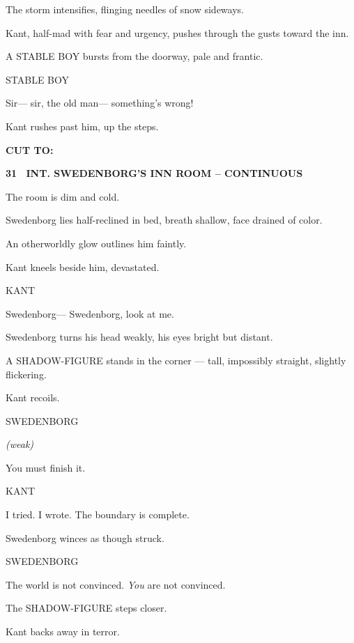 \documentclass[12pt]{article}
\newcommand{\scene}[2]{%
  \vspace{1.8\baselineskip}%
  \noindent\textbf{#1 \ #2}\par\vspace{0.4\baselineskip}%
}
\newenvironment{dialogue}[1]{%
  \vspace{0.8\baselineskip}%
  \noindent\hspace*{2.3in}\textsc{#1}\par%
  \noindent\hspace*{1.5in}\begin{minipage}[t]{4.5in}%
}{%
  \end{minipage}\par%
}
\newcommand{\paren}[1]{%
  \noindent\hspace*{1.8in}\textit{(#1)}\par%
}
\newcommand{\transition}[1]{%
  \vspace{0.6\baselineskip}%
  \begin{flushright}\textbf{#1}\end{flushright}%
}
\begin{document}
The storm intensifies, flinging needles of snow sideways.

Kant, half-mad with fear and urgency, pushes through the gusts toward
the inn.

A STABLE BOY bursts from the doorway, pale and frantic.

\begin{dialogue}{STABLE BOY}
Sir— sir, the old man— something’s wrong!
\end{dialogue}

Kant rushes past him, up the steps.

\transition{CUT TO:}


\scene{31}{INT. SWEDENBORG’S INN ROOM -- CONTINUOUS}

The room is dim and cold.

Swedenborg lies half-reclined in bed, breath shallow, face drained of
color.

An otherworldly glow outlines him faintly.

Kant kneels beside him, devastated.

\begin{dialogue}{KANT}
Swedenborg— Swedenborg, look at me.
\end{dialogue}

Swedenborg turns his head weakly, his eyes bright but distant.

A SHADOW-FIGURE stands in the corner — tall, impossibly straight,
slightly flickering.

Kant recoils.

\begin{dialogue}{SWEDENBORG}
\paren{weak}
You must finish it.
\end{dialogue}

\begin{dialogue}{KANT}
I tried. I wrote. The boundary is complete.
\end{dialogue}

Swedenborg winces as though struck.

\begin{dialogue}{SWEDENBORG}
The world is not convinced. \emph{You} are not convinced.
\end{dialogue}

The SHADOW-FIGURE steps closer.

Kant backs away in terror.
\end{document}
